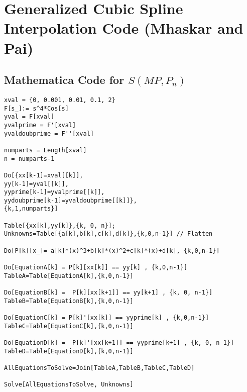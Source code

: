 

%
\chapter*{\thechapter \quad Generalized Cubic Spline Interpolation Code (Mhaskar and Pai)}
\label{appendixB}

\section{Mathematica Code for $S(MP, P_{n})$}
\begin{lstlisting}
xval = {0, 0.001, 0.01, 0.1, 2}         
F[s_]:= s^4*Cos[s]
yval = F[xval]
yvalprime = F'[xval]
yvaldoubprime = F''[xval]      

numparts = Length[xval]  
n = numparts-1                 

Do[{xx[k-1]=xval[[k]],               
yy[k-1]=yval[[k]],
yyprime[k-1]=yvalprime[[k]],
yydoubprime[k-1]=yvaldoubprime[[k]]},
{k,1,numparts}]

Table[{xx[k],yy[k]},{k, 0, n}];
Unknowns=Table[{a[k],b[k],c[k],d[k]},{k,0,n-1}] // Flatten           

Do[P[k][x_]= a[k]*(x)^3+b[k]*(x)^2+c[k]*(x)+d[k], {k,0,n-1}]             

Do[EquationA[k] = P[k][xx[k]] == yy[k] , {k,0,n-1}]
TableA=Table[EquationA[k],{k,0,n-1}]

Do[EquationB[k] =  P[k][xx[k+1]] == yy[k+1] , {k, 0, n-1}]  
TableB=Table[EquationB[k],{k,0,n-1}] 

Do[EquationC[k] = P[k]'[xx[k]] == yyprime[k] , {k,0,n-1}]
TableC=Table[EquationC[k],{k,0,n-1}]

Do[EquationD[k] =  P[k]'[xx[k+1]] == yyprime[k+1] , {k, 0, n-1}]  
TableD=Table[EquationD[k],{k,0,n-1}] 

AllEquationsToSolve=Join[TableA,TableB,TableC,TableD]

Solve[AllEquationsToSolve, Unknowns] 
\end{lstlisting}
